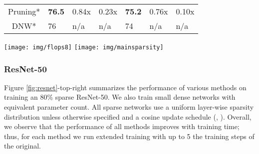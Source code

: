 \documentclass{article}
\begin{document}
\begin{figure*}[t]
\begin{minipage}{.63\textwidth}
\begin{tabular}{c|p{4em}|p{3em}|p{3em}||p{4em}|p{3em}|p{3em}}
    Pruning* & \textbf{76.5} & 0.84x & 0.23x & \textbf{75.2} & 0.76x & 0.10x \\
    DNW* & 76 & n/a & n/a & 74 & n/a & n/a \\
\bottomrule
    \end{tabular}
\end{minipage}
\begin{minipage}{.35\textwidth}
  \centering
  \texttt{[image: img/flops8]}
  \texttt{[image: img/mainsparsity]}
\end{minipage}\caption{\textbf{(left)} Performance and cost of training 80\% and 90\% sparse ResNet-50s on the Imagenet-2012 classification task. We report FLOPs needed for training and test (inference on single sample) and normalize them with the FLOPs of a dense model. To make a fair comparison we assume pruning algorithm utilizes sparsity during the training (see Appendix \ref{app:flops} for details on how FLOPs are calculated). Methods with superscript `*' indicates reported results in corresponding papers (except DNW results, which is obtained from \citep{kusupati2020str}). Pruning results are obtained from \cite{gale2019state}. \textbf{(top-right)} Performance of sparse training methods on training 80\% sparse ResNet-50 with uniform sparsity distribution. Points at each curve correspond to the individual training runs with training multipliers from 1 to 5 (except pruning which is scaled between 0.5 and 2). The number of FLOPs required to train a standard dense ResNet-50 along with its performance is indicated with a dashed red line. ~\textbf{(bottom-right)} Performance of \textit{RigL} at different sparsity levels with extended training.}
\label{fig:resnet}
\end{figure*}

\subsubsection{ResNet-50}
\label{sec:experiments_ResNet}
Figure \ref{fig:resnet}-top-right summarizes the performance of various methods on training an 80\% sparse ResNet-50. We also train small dense networks with equivalent parameter count. All sparse networks use a uniform layer-wise sparsity distribution unless otherwise specified and a cosine update schedule (, ). Overall, we observe that the performance of all methods improves with training time; thus, for each method we run extended training with up to 5 the training steps of the original.
\end{document}
